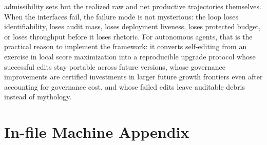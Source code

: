 \documentclass[11pt]{article}
\theoremstyle{definition}
\newcommand{\1}{\mathbf{1}}
\begin{document}
admissibility sets but the realized raw and net productive trajectories themselves. When the interfaces fail, the failure mode is not mysterious: the loop loses identifiability, loses audit mass, loses deployment liveness, loses protected budget, or loses throughput before it loses rhetoric. For autonomous agents, that is the practical reason to implement the framework: it converts self-editing from an exercise in local score maximization into a reproducible upgrade protocol whose successful edits stay portable across future versions, whose governance improvements are certified investments in larger future growth frontiers even after accounting for governance cost, and whose failed edits leave auditable debris instead of mythology.


\appendix
\section*{In-file Machine Appendix}
\end{document}
